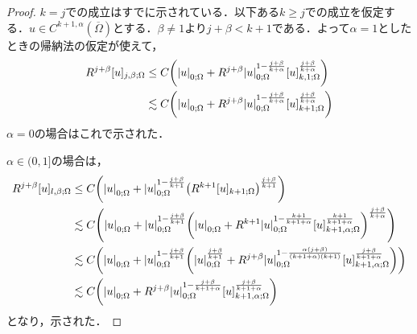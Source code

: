 \documentclass[a4paper]{ltjsarticle}
\newcommand{\Om}{\Omega}
\newcommand{\Ombar}{\overline{\Omega}}
\newcommand{\1}{\mathbbm{1}}
\numberwithin{equation}{section}
\theoremstyle{definition}
\begin{document}
\begin{proof}
    $k=j$での成立はすでに示されている．以下ある$k\geq j$での成立を仮定する．$u\in C^{k+1,\alpha}(\Ombar)$とする．$\beta\neq1$より$j+\beta<k+1$である．よって$\alpha=1$としたときの帰納法の仮定が使えて，
    \begin{align}
        R^{j+\beta}[u]_{j,\beta;\Om}&\leq C\qty(\abs{u}_{0;\Om}+R^{j+\beta}\abs{u}_{0;\Om}^{1-\frac{j+\beta}{k+\alpha}}[u]_{k,1;\Om}^{\frac{j+\beta}{k+\alpha}})\\
        &\lesssim C\qty(\abs{u}_{0;\Om}+R^{j+\beta}\abs{u}_{0;\Om}^{1-\frac{j+\beta}{k+\alpha}}[u]_{k+1;\Om}^{\frac{j+\beta}{k+\alpha}}) 
    \end{align}
    $\alpha=0$の場合はこれで示された．
    
    $\alpha\in(0,1]$の場合は，
    \begin{align}
        R^{j+\beta}[u]_{l,\beta;\Om}&\leq C\qty(\abs{u}_{0;\Om}+\abs{u}_{0;\Om}^{1-\frac{j+\beta}{k+1}}\qty(R^{k+1}[u]_{k+1;\Om})^{\frac{j+\beta}{k+1}})\\
        &\lesssim C\qty(\abs{u}_{0;\Om}+\abs{u}_{0;\Om}^{1-\frac{j+\beta}{k+1}}\qty(\abs{u}_{0;\Om}+R^{k+1}\abs{u}_{0;\Om}^{1-\frac{k+1}{k+1+\alpha}}[u]_{k+1,\alpha;\Om}^{\frac{k+1}{k+1+\alpha}})^{\frac{j+\beta}{k+\alpha}})\\
        &\lesssim C\qty(\abs{u}_{0;\Om}+\abs{u}_{0;\Om}^{1-\frac{j+\beta}{k+1}}\qty(\abs{u}_{0;\Om}^{\frac{j+\beta}{k+1}}+R^{j+\beta}\abs{u}_{0;\Om}^{1-\frac{\alpha(j+\beta)}{(k+1+\alpha)(k+1)}}[u]_{k+1,\alpha;\Om}^{\frac{j+\beta}{k+1+\alpha}}))\\
        &\lesssim C\qty(\abs{u}_{0;\Om}+R^{j+\beta}\abs{u}_{0;\Om}^{1-\frac{j+\beta}{k+1+\alpha}}[u]_{k+1,\alpha;\Om}^{\frac{j+\beta}{k+1+\alpha}})
    \end{align}
    となり，示された．
\end{proof}
\end{document}
